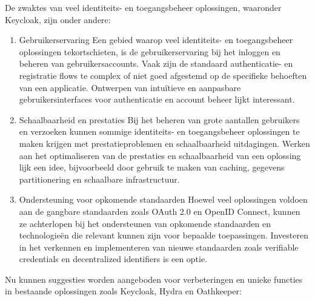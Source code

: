 De zwaktes van veel identiteits- en toegangsbeheer oplossingen, waaronder Keycloak, zijn onder andere:

\begin{enumerate}
  \item Gebruikerservaring
  Een gebied waarop veel identiteits- en toegangsbeheer oplossingen tekortschieten, is de gebruikerservaring bij het inloggen en beheren van gebruikersaccounts. Vaak zijn de standaard authenticatie- en registratie flows te complex of niet goed afgestemd op de specifieke behoeften van een applicatie. Ontwerpen van intuïtieve en aanpasbare gebruikersinterfaces voor authenticatie en account beheer lijkt interessant.
  
  \item Schaalbaarheid en prestaties
  Bij het beheren van grote aantallen gebruikers en verzoeken kunnen sommige identiteits- en toegangsbeheer oplossingen te maken krijgen met prestatieproblemen en schaalbaarheid uitdagingen. Werken aan het optimaliseren van de prestaties en schaalbaarheid van een oplossing lijk een idee, bijvoorbeeld door gebruik te maken van caching, gegevens partitionering en schaalbare infrastructuur.
  
  \item Ondersteuning voor opkomende standaarden
  Hoewel veel oplossingen voldoen aan de gangbare standaarden zoals OAuth 2.0 en OpenID Connect, kunnen ze achterlopen bij het ondersteunen van opkomende standaarden en technologieën die relevant kunnen zijn voor bepaalde toepassingen. Investeren in het verkennen en implementeren van nieuwe standaarden zoals verifiable credentials en decentralized identifiers is een optie.
\end{enumerate}

Nu kunnen suggesties worden aangeboden voor verbeteringen en unieke functies in bestaande oplossingen zoals Keycloak, Hydra en Oathkeeper:

